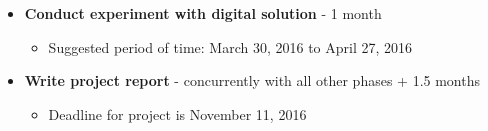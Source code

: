 \documentclass[12pt]{article}
\begin{document}
\begin{itemize}
		\item \textbf{Conduct experiment with digital solution} - 1 month
			\begin{itemize}
				\item Suggested period of time: March 30, 2016 to April 27, 2016
			\end{itemize}	
		\item \textbf{Write project report} - concurrently with all other phases + 1.5 months
			\begin{itemize}
				\item Deadline for project is November 11, 2016
			\end{itemize}	
	\end{itemize}

%




\end{document}
